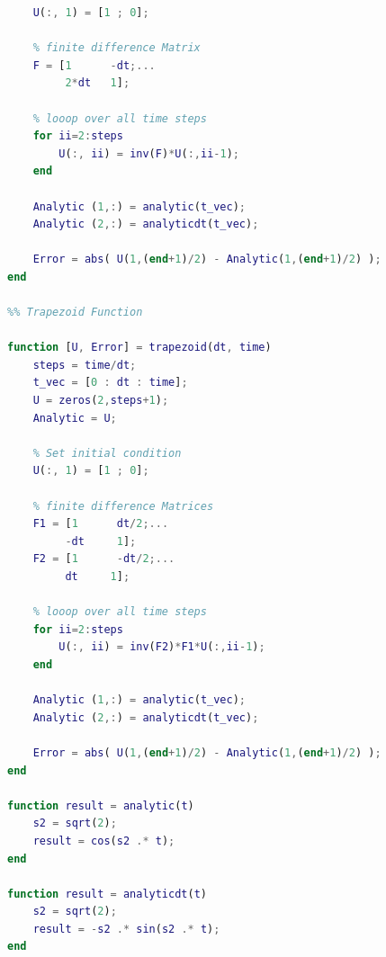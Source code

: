 \documentclass[12pt,letterpaper]{article}
\begin{document}
\begin{lstlisting}[language = Matlab]
    % Set initial condition
    U(:, 1) = [1 ; 0];
    
    % finite difference Matrix
    F = [1      -dt;...
         2*dt   1];
    
    % looop over all time steps
    for ii=2:steps
        U(:, ii) = inv(F)*U(:,ii-1);
    end
    
    Analytic (1,:) = analytic(t_vec);
    Analytic (2,:) = analyticdt(t_vec);

    Error = abs( U(1,(end+1)/2) - Analytic(1,(end+1)/2) ); 
end

%% Trapezoid Function

function [U, Error] = trapezoid(dt, time)
    steps = time/dt;
    t_vec = [0 : dt : time]; 
    U = zeros(2,steps+1);
    Analytic = U;
    
    % Set initial condition
    U(:, 1) = [1 ; 0];
    
    % finite difference Matrices
    F1 = [1      dt/2;...
         -dt     1];
    F2 = [1      -dt/2;...
         dt     1];
    
    % looop over all time steps
    for ii=2:steps
        U(:, ii) = inv(F2)*F1*U(:,ii-1);
    end
    
    Analytic (1,:) = analytic(t_vec);
    Analytic (2,:) = analyticdt(t_vec);

    Error = abs( U(1,(end+1)/2) - Analytic(1,(end+1)/2) ); 
end

function result = analytic(t)
    s2 = sqrt(2);
    result = cos(s2 .* t);
end

function result = analyticdt(t)
    s2 = sqrt(2);
    result = -s2 .* sin(s2 .* t);
end
\end{lstlisting}
\end{document}
